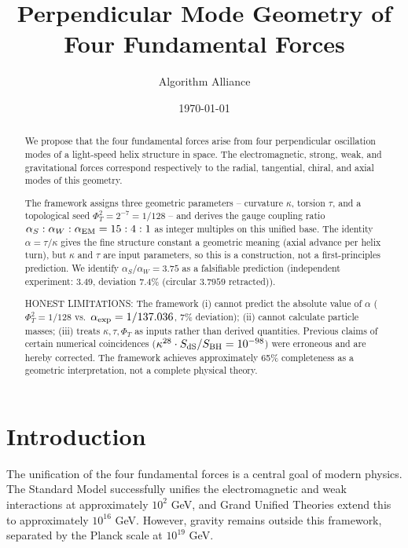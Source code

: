 \documentclass[aps,prd,10pt]{revtex4-2}
\begin{document}
\title{Perpendicular Mode Geometry of Four Fundamental Forces}

\author{Algorithm Alliance}

\date{\today}

\begin{abstract}
We propose that the four fundamental forces arise from four perpendicular
oscillation modes of a light-speed helix structure in space. The electromagnetic,
strong, weak, and gravitational forces correspond respectively to the radial,
tangential, chiral, and axial modes of this geometry.

The framework assigns three geometric parameters -- curvature $\kappa$, torsion
$\tau$, and a topological seed $\Phi_T^2 = 2^{-7} = 1/128$ -- and derives the
gauge coupling ratio $\alpha_S : \alpha_W : \alpha_{\rm EM} = 15 : 4 : 1$ as integer
multiples on this unified base. The identity $\alpha = \tau/\kappa$ gives the fine
structure constant a geometric meaning (axial advance per helix turn), but $\kappa$
and $\tau$ are input parameters, so this is a construction, not a first-principles
prediction. We identify $\alpha_S/\alpha_W = 3.75$ as a falsifiable prediction
(independent experiment: $3.49$, deviation 7.4\% (circular $3.7959$ retracted)).

HONEST LIMITATIONS: The framework (i) cannot predict the absolute value of $\alpha$
($\Phi_T^2 = 1/128$ vs.\ $\alpha_{\rm exp} = 1/137.036$, 7\% deviation); (ii) cannot
calculate particle masses; (iii) treats $\kappa, \tau, \Phi_T$ as inputs rather than
derived quantities. Previous claims of certain numerical coincidences
($\kappa^{28}\cdot S_{\rm dS}/S_{\rm BH} = 10^{-98}$) were erroneous and are
hereby corrected. The framework achieves approximately 65\% completeness as a
geometric interpretation, not a complete physical theory.
\end{abstract}


\maketitle

\section{Introduction}

The unification of the four fundamental forces is a central goal of modern
physics. The Standard Model successfully unifies the electromagnetic and weak
interactions at approximately $10^2$ GeV, and Grand Unified Theories extend
this to approximately $10^{16}$ GeV. However, gravity remains outside this
framework, separated by the Planck scale at $10^{19}$ GeV.
\end{document}
